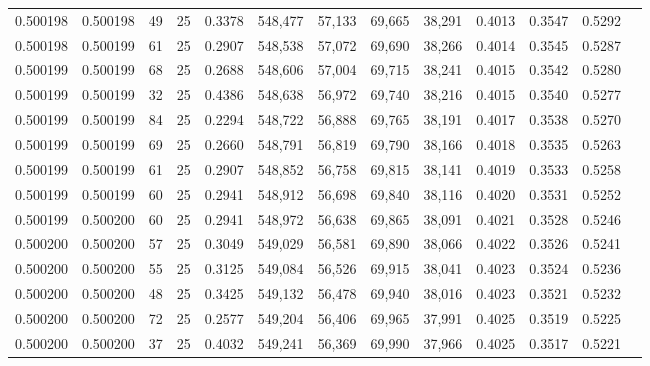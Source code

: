 \begin{tabular}{rrrrrrrrrrrrr}
0.500198 & 0.500198 &    49 &  25 &                                     0.3378 & 548,477 &  57,133 &  69,665 &  38,291 & 0.4013 & 0.3547 & 0.5292 \\
0.500198 & 0.500199 &    61 &  25 &                                     0.2907 & 548,538 &  57,072 &  69,690 &  38,266 & 0.4014 & 0.3545 & 0.5287 \\
0.500199 & 0.500199 &    68 &  25 &                                     0.2688 & 548,606 &  57,004 &  69,715 &  38,241 & 0.4015 & 0.3542 & 0.5280 \\
0.500199 & 0.500199 &    32 &  25 &                                     0.4386 & 548,638 &  56,972 &  69,740 &  38,216 & 0.4015 & 0.3540 & 0.5277 \\
0.500199 & 0.500199 &    84 &  25 &                                     0.2294 & 548,722 &  56,888 &  69,765 &  38,191 & 0.4017 & 0.3538 & 0.5270 \\
0.500199 & 0.500199 &    69 &  25 &                                     0.2660 & 548,791 &  56,819 &  69,790 &  38,166 & 0.4018 & 0.3535 & 0.5263 \\
0.500199 & 0.500199 &    61 &  25 &                                     0.2907 & 548,852 &  56,758 &  69,815 &  38,141 & 0.4019 & 0.3533 & 0.5258 \\
0.500199 & 0.500199 &    60 &  25 &                                     0.2941 & 548,912 &  56,698 &  69,840 &  38,116 & 0.4020 & 0.3531 & 0.5252 \\
0.500199 & 0.500200 &    60 &  25 &                                     0.2941 & 548,972 &  56,638 &  69,865 &  38,091 & 0.4021 & 0.3528 & 0.5246 \\
0.500200 & 0.500200 &    57 &  25 &                                     0.3049 & 549,029 &  56,581 &  69,890 &  38,066 & 0.4022 & 0.3526 & 0.5241 \\
0.500200 & 0.500200 &    55 &  25 &                                     0.3125 & 549,084 &  56,526 &  69,915 &  38,041 & 0.4023 & 0.3524 & 0.5236 \\
0.500200 & 0.500200 &    48 &  25 &                                     0.3425 & 549,132 &  56,478 &  69,940 &  38,016 & 0.4023 & 0.3521 & 0.5232 \\
0.500200 & 0.500200 &    72 &  25 &                                     0.2577 & 549,204 &  56,406 &  69,965 &  37,991 & 0.4025 & 0.3519 & 0.5225 \\
0.500200 & 0.500200 &    37 &  25 &                                     0.4032 & 549,241 &  56,369 &  69,990 &  37,966 & 0.4025 & 0.3517 & 0.5221 \\

\end{tabular}
